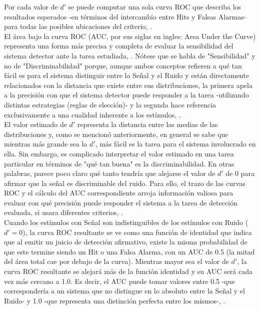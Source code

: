 Por cada valor de $d'$ se puede computar una sola curva ROC que describa los resultados esperados -en términos del intercambio entre Hits y Falsas Alarmas- para todas las posibles ubicaciones del criterio, \parencite{Tanner1954, Swets1961, Swets1973, Stainslaw1999}.\\


El área bajo la curva ROC (AUC, por sus siglas en ingles: Area Under the Curve) representa una forma más precisa y completa de evaluar la sensibilidad del sistema detector ante la tarea estudiada, \parencite{Centor1985,  Stainslaw1999, McNicol5}. Nótese que se habla de "Sensibilidad" y no de "Discriminabilidad" porque, aunque ambos conceptos refieren a qué tan fácil es para el sistema distinguir entre la Señal y el Ruido y están directamente relacionados con la distancia que existe entre sus distribuciones, la primera apela a la precisión con que el sistema detector puede responder a la tarea -utilizando distintas estrategias (reglas de elección)- y la segunda hace referencia exclusivamente a una cualidad inherente a los estímulos, \parencite{Swets1973}.\\

El valor estimado de $d'$ representa la distancia entre las medias de las distribuciones y, como se mencionó anteriormente, en general se sabe que mientras más grande sea la $d'$, más fácil es la tarea para el sistema involucrado en ella. Sin embargo, es complicado interpretar el valor estimado en una tarea particular en términos de "qué tan buena" es la discriminabilidad. En otras palabras, parece poco claro qué tanto tendría que alejarse el valor de $d'$ de $0$ para afirmar que la señal es discriminable del ruido. Para ello, el trazo de las curvas ROC y el cálculo del AUC correspondiente arroja información valiosa para evaluar con qué precisión puede responder el sistema a la tarea de detección evaluada, si usara diferentes criterios, \parencite{Stainslaw1999}.\\ 

Cuando los estímulos con Señal son indistinguibles de los estímulos con Ruido ($d' = 0$), la curva ROC resultante se ve como una función de identidad que indica que al emitir un juicio de detección afirmativo, existe la misma probabilidad de que este termine siendo un Hit o una Falsa Alarma, con un AUC de 0.5 (la mitad del área total cae por debajo de la curva). Mientras mayor sea el valor de $d'$, la curva ROC resultante se alejará más de la función identidad y su AUC será cada vez más cercano a 1.0. Es decir, el AUC puede tomar valores entre 0.5 -que correspondería a un sistema que no distingue en lo absoluto entre la Señal y el Ruido- y 1.0 -que representa una distinción perfecta entre los mismos-, \parencite{Swets1973, Stainslaw1999, McNicol5}.\\

